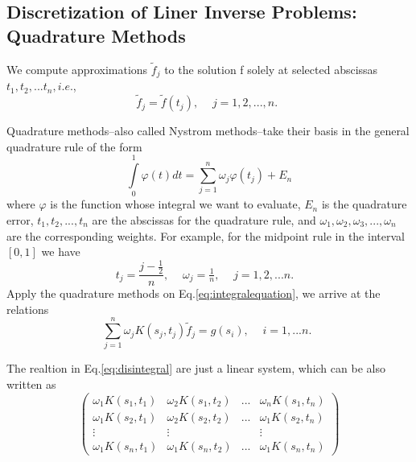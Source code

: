 \documentclass{article}
\begin{document}
\subsection{Discretization of Liner Inverse Problems: Quadrature Methods}
We compute approximations \({\tilde f_j}\) to the solution f solely at selected
abscissas \({t_1},{t_2},...{t_n},i.e.\),
\[{\tilde f_j} = \tilde f({t_j}),\begin{array}{*{20}{c}}
{}&{j = 1,2,...,n.}
\end{array}\]

Quadrature methods--also called Nystrom methods--take their basis in the general
quadrature rule of the form 
\[\int\limits_0^1 {\varphi (t)dt = \sum\limits_{j = 1}^n {{\omega _j}\varphi
({t_j})} }  + {E_n}\]
where \(\varphi \) is the function whose integral we want to evaluate, \({E_n}\)
is the quadrature error, \({t_1},{t_2},...,{t_n}\) are the abscissas for the
quadrature rule, and \({\omega _1},{\omega _2},{\omega _3},...,{\omega _n}\) are
the corresponding weights. For example, for the midpoint rule in the interval
\([0, 1]\) we have
\begin{equation}
{t_j} = \frac{{j - \frac{1}{2}}}{n},\begin{array}{*{20}{c}}
{}&{{\omega _j} = \frac{1}{n},\begin{array}{*{20}{c}}
{}&{j = 1,2,...n.}
\end{array}}
\end{array}
\end{equation}
Apply the quadrature methods on Eq.\ref{eq:integralequation}, we arrive at the
relations
\begin{equation}
\sum\limits_{j = 1}^n {{\omega _j}K({s_j},{t_j})} {\tilde f_j} = g({s_i}),\begin{array}{*{20}{c}}
{}&{i = 1,...n.}
\end{array}
\end{equation}

The realtion in Eq.\ref{eq:disintegral} are just a linear system, which can be
also written as
\[\left( {\begin{array}{*{20}{c}}
{{\omega _1}K({s_1},{t_1})}&{{\omega _2}K({s_1},{t_2})}&{...}&{{\omega _n}K({s_1},{t_n})}\\
{{\omega _1}K({s_2},{t_1})}&{{\omega _2}K({s_2},{t_2})}&{...}&{{\omega _1}K({s_2},{t_n})}\\
 \vdots & \vdots &{}& \vdots \\
{{\omega _1}K({s_n},{t_1})}&{{\omega _1}K({s_n},{t_2})}&{...}&{{\omega _1}K({s_n},{t_n})}
\end{array}} \right)\]
\end{document}
